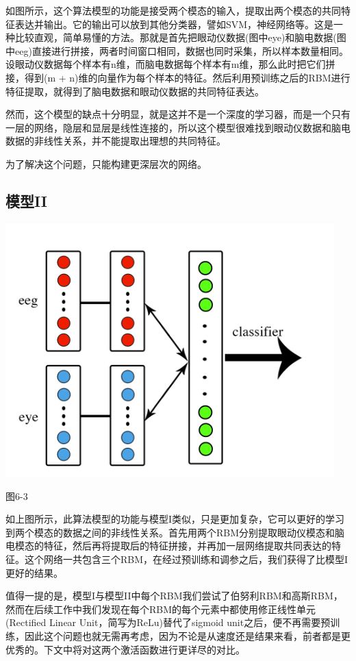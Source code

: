	如图所示，这个算法模型的功能是接受两个模态的输入，提取出两个模态的共同特征表达并输出。它的输出可以放到其他分类器，譬如SVM，神经网络等。这是一种比较直观，简单易懂的方法。那就是首先把眼动仪数据(图中eye)和脑电数据(图中eeg)直接进行拼接，两者时间窗口相同，数据也同时采集，所以样本数量相同。设眼动仪数据每个样本有n维，而脑电数据每个样本有m维，那么此时把它们拼接，得到(m + n)维的向量作为每个样本的特征。然后利用预训练之后的RBM进行特征提取，就得到了脑电数据和眼动仪数据的共同特征表达。
	
	然而，这个模型的缺点十分明显，就是这并不是一个深度的学习器，而是一个只有一层的网络，隐层和显层是线性连接的，所以这个模型很难找到眼动仪数据和脑电数据的非线性关系，并不能提取出理想的共同特征。
	
	为了解决这个问题，只能构建更深层次的网络。	
	\subsection{模型II}
		\centerline{\includegraphics[width=5in]{figure/classify1.png}}
		\centerline{图6-3}
		如上图所示，此算法模型的功能与模型I类似，只是更加复杂，它可以更好的学习到两个模态的数据之间的非线性关系。首先用两个RBM分别提取眼动仪模态和脑电模态的特征，然后再将提取后的特征拼接，并再加一层网络提取共同表达的特征。这个网络一共包含三个RBM，在经过预训练和调参之后，我们获得了比模型I更好的结果。
		
		值得一提的是，模型I与模型II中每个RBM我们尝试了伯努利RBM和高斯RBM，然而在后续工作中我们发现在每个RBM的每个元素中都使用修正线性单元(Rectified Linear Unit，简写为ReLu)替代了sigmoid unit之后，便不再需要预训练，因此这个问题也就无需再考虑，因为不论是从速度还是结果来看，前者都是更优秀的。下文中将对这两个激活函数进行更详尽的对比。
